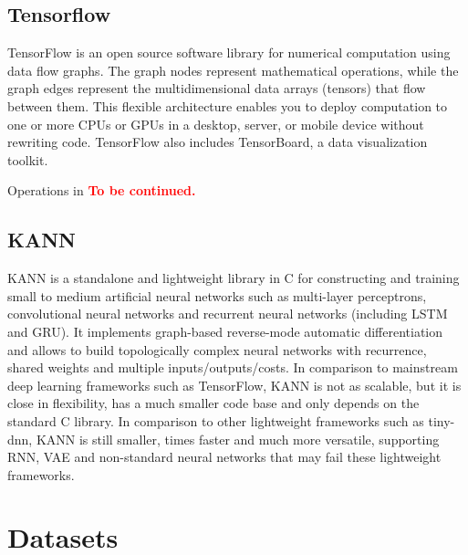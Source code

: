 \subsection{Tensorflow}
TensorFlow is an open source software library for numerical computation using data 
flow graphs. The graph nodes represent mathematical operations, while the graph 
edges represent the multidimensional data arrays (tensors) that flow between them. 
This flexible architecture enables you to deploy computation to one or more CPUs or 
GPUs in a desktop, server, or mobile device without rewriting code. TensorFlow 
also includes TensorBoard, a data visualization toolkit. 

Operations in \textbf{\textcolor{red}{To be continued.}}

\subsection{KANN}
KANN is a standalone and lightweight library in C for constructing and training 
small to medium artificial neural networks such as multi-layer perceptrons, 
convolutional neural networks and recurrent neural networks (including LSTM and GRU). 
It implements graph-based reverse-mode automatic differentiation and allows to build 
topologically complex neural networks with recurrence, shared weights and multiple 
inputs/outputs/costs. In comparison to mainstream deep learning frameworks such as 
TensorFlow, KANN is not as scalable, but it is close in flexibility, has a much smaller 
code base and only depends on the standard C library. In comparison to other 
lightweight frameworks such as tiny-dnn, KANN is still smaller, times faster and 
much more versatile, supporting RNN, VAE and non-standard neural networks that 
may fail these lightweight frameworks.

\section{Datasets}
